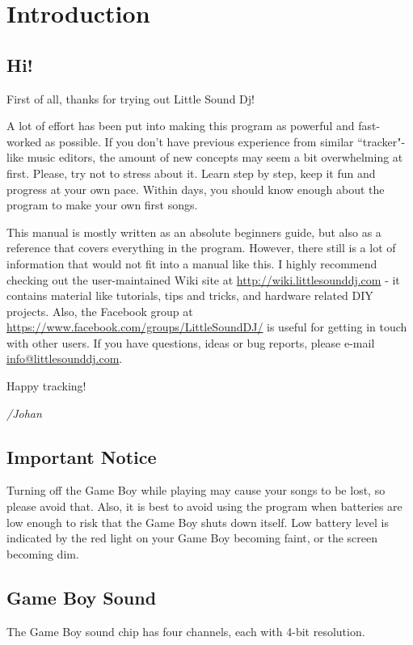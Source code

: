 \chapter{Introduction}
\section{Hi!}
First of all, thanks for trying out Little Sound Dj!

A lot of effort has been put into making this program as powerful and fast-worked
as possible. If you don't have previous experience from similar ``tracker"-like
music editors, the amount of new concepts may seem a bit overwhelming at first.
Please, try not to stress about it. Learn step by step, keep it fun and progress
at your own pace. Within days, you should know enough about the
program to make your own first songs.

This manual is mostly written as an absolute beginners guide, but also as a reference
that covers everything in the program. However, there still
is a lot of information that would not fit into a manual like this. I highly recommend
checking out the user-maintained Wiki site at \url{http://wiki.littlesounddj.com} -
it contains material like tutorials, tips and tricks, and
hardware related DIY projects. Also, the Facebook group
at \url{https://www.facebook.com/groups/LittleSoundDJ/} is useful for getting in touch
with other users.
If you have questions, ideas or bug reports, please e-mail
\href{mailto:info@littlesounddj.com}{info@littlesounddj.com}.

Happy tracking!

\textit{/Johan}

\section{Important Notice}

Turning off the Game Boy while playing may cause your songs to be lost, so please avoid that.
Also, it is best to avoid using the program when batteries are low enough to risk that the
Game Boy shuts down itself. Low battery level is indicated by the red light on your Game Boy
becoming faint, or the screen becoming dim.

\section{Game Boy Sound}
The Game Boy sound chip has four channels, each with 4-bit resolution.

